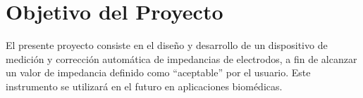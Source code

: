 \section{Objetivo del Proyecto}

El presente proyecto consiste en el diseño y desarrollo de un dispositivo de medición y corrección automática de impedancias de electrodos, a fin de alcanzar un valor de impedancia definido como ``aceptable'' por el usuario. Este instrumento se utilizará en el futuro en aplicaciones biomédicas.



